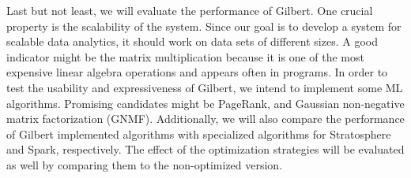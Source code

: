 Last but not least, we will evaluate the performance of Gilbert.
One crucial property is the scalability of the system.
Since our goal is to develop a system for scalable data analytics, it should work on data sets of different sizes.
A good indicator might be the matrix multiplication because it is one of the most expensive linear algebra operations and appears often in programs.
In order to test the usability and expressiveness of Gilbert, we intend to implement some ML algorithms.
Promising candidates might be PageRank, \kmeans and Gaussian non-negative matrix factorization (GNMF).
Additionally, we will also compare the performance of Gilbert implemented algorithms with specialized algorithms for Stratosphere and Spark, respectively.
The effect of the optimization strategies will be evaluated as well by comparing them to the non-optimized version.